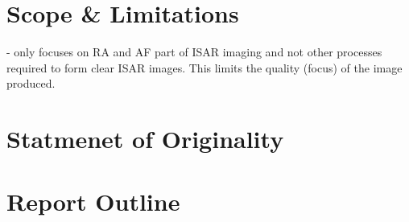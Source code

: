 \documentclass[class=report,11pt,crop=false]{standalone}
\begin{document}
\section{Scope \& Limitations}
- only focuses on RA and AF part of ISAR imaging and not other processes required to form clear ISAR images. This limits the quality (focus) of the image produced.

\section{Statmenet of Originality}

\section{Report Outline}


\ifstandalone

\printnoidxglossary[type=\acronymtype,nonumberlist]
\fi
\end{document}
